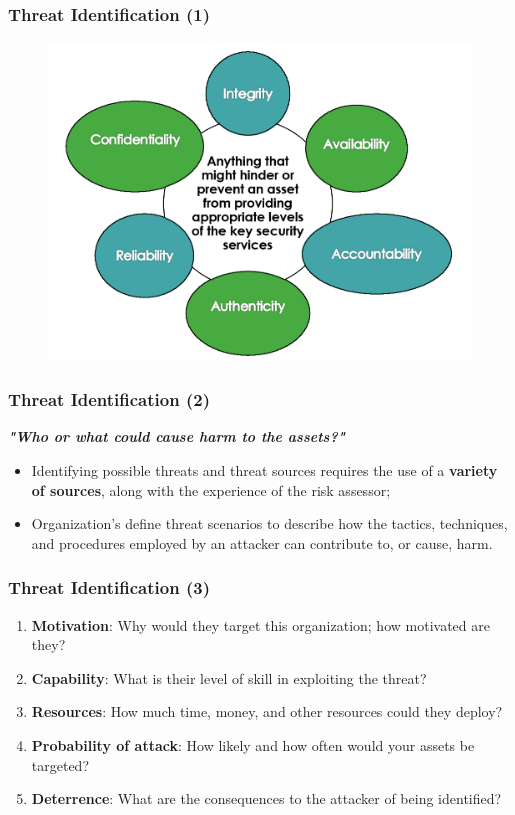 \documentclass[xcolor ={table,usenames,dvipsnames}]{beamer}
\theoremstyle{definition}
\begin{document}
	\begin{frame}
		\frametitle{Threat Identification (1)}
			\begin{figure}[h!]
			\centering
			\includegraphics[scale=0.25]{img/img_12.PNG}
			\label{Interfacce di un CS}
		\end{figure}
	\end{frame}

	\begin{frame}
		\frametitle{Threat Identification (2)}
		\textbf{\textit{"Who or what could cause harm to the assets?"}}
		\begin{itemize}
			\item Identifying possible threats and threat sources requires the use of a \textbf{variety of sources}, along with the experience of the risk assessor; 
			\item  Organization’s define threat scenarios to describe how the tactics, techniques, and procedures employed by an attacker can contribute to, or cause, harm. 
		\end{itemize}
	\end{frame}

	\begin{frame}
		\frametitle{Threat Identification (3)}
		\begin{enumerate}
			\item  \textbf{Motivation}: Why would they target this organization; how motivated are they?
			\item \textbf{Capability}: What is their level of skill in exploiting the threat?
			\item \textbf{Resources}: How much time, money, and other resources could they deploy?
			\item \textbf{Probability of attack}: How likely and how often would your assets be targeted?
			\item \textbf{Deterrence}: What are the consequences to the attacker of being identified?	
		\end{enumerate}
	\end{frame}
	
\end{document}
